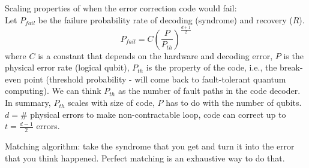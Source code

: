 Scaling properties of when the error correction code would fail: \\
Let $P_{fail}$ be the failure probability rate of decoding (syndrome) and recovery ($R$). 
\begin{equation}
    P_{fail} = C \left(\frac{P}{P_{th}}\right)^{\frac{d+1}{2}}
\end{equation}
where $C$ is a constant that depends on the hardware and decoding error, $P$ is the physical error rate (logical qubit), $P_{th}$ is the property of the code, i.e., the break-even point (threshold probability - will come back to fault-tolerant quantum computing). We can think $P_{th}$ as the number of fault paths in the code decoder. \\
In summary, $P_{th}$ scales with size of code, $P$ has to do with the number of qubits. \\

$d = \#$ physical errors to make non-contractable loop, code can correct up to $t = \frac{d-1}{2}$ errors.  

Matching algorithm: take the syndrome that you get and turn it into the error that you think happened. Perfect matching is an exhaustive way to do that. 
